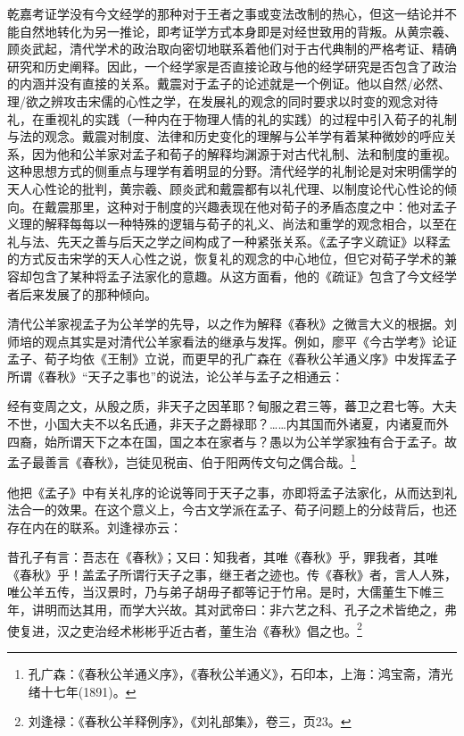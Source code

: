 \documentclass[a4paper, 12pt, openright]{ctexbook}
\renewenvironment{quote}
  {\list{}{\rightmargin2\ccwd \leftmargin2\ccwd \itemindent=2\ccwd \listparindent=2\ccwd}%
   \item\relax\small\kaishu\color{black}}
  {\endlist}
\begin{document}
乾嘉考证学没有今文经学的那种对于王者之事或变法改制的热心，但这一结论并不能自然地转化为另一推论，即考证学方式本身即是对经世致用的背叛。从黄宗羲、顾炎武起，清代学术的政治取向密切地联系着他们对于古代典制的严格考证、精确研究和历史阐释。因此，一个经学家是否直接论政与他的经学研究是否包含了政治的内涵并没有直接的关系。戴震对于孟子的论述就是一个例证。他以自然/必然、理/欲之辨攻击宋儒的心性之学，在发展礼的观念的同时要求以时变的观念对待礼，在重视礼的实践（一种内在于物理人情的礼的实践）的过程中引入荀子的礼制与法的观念。戴震对制度、法律和历史变化的理解与公羊学有着某种微妙的呼应关系，因为他和公羊家对孟子和荀子的解释均渊源于对古代礼制、法和制度的重视。这种思想方式的侧重点与理学有着明显的分野。清代经学的礼制论是对宋明儒学的天人心性论的批判，黄宗羲、顾炎武和戴震都有以礼代理、以制度论代心性论的倾向。在戴震那里，这种对于制度的兴趣表现在他对荀子的矛盾态度之中：他对孟子义理的解释每每以一种特殊的逻辑与荀子的礼义、尚法和重学的观念相合，以至在礼与法、先天之善与后天之学之间构成了一种紧张关系。《孟子字义疏证》以释孟的方式反击宋学的天人心性之说，恢复礼的观念的中心地位，但它对荀子学术的兼容却包含了某种将孟子法家化的意趣。从这方面看，他的《疏证》包含了今文经学者后来发展了的那种倾向。

清代公羊家视孟子为公羊学的先导，以之作为解释《春秋》之微言大义的根据。刘师培的观点其实是对清代公羊家看法的继承与发挥。例如，廖平《今古学考》论证孟子、荀子均依《王制》立说，而更早的孔广森在《春秋公羊通义序》中发挥孟子所谓《春秋》“天子之事也”的说法，论公羊与孟子之相通云：

\begin{quote}
经有变周之文，从殷之质，非天子之因革耶？甸服之君三等，蕃卫之君七等。大夫不世，小国大夫不以名氏通，非天子之爵禄耶？……内其国而外诸夏，内诸夏而外四裔，始所谓天下之本在国，国之本在家者与？愚以为公羊学家独有合于孟子。故孟子最善言《春秋》，岂徒见税亩、伯于阳两传文句之偶合哉。\footnote{孔广森：《春秋公羊通义序》，《春秋公羊通义》，石印本，上海：鸿宝斋，清光绪十七年(1891)。}
\end{quote}

他把《孟子》中有关礼序的论说等同于天子之事，亦即将孟子法家化，从而达到礼法合一的效果。在这个意义上，今古文学派在孟子、荀子问题上的分歧背后，也还存在内在的联系。刘逢禄亦云：

\begin{quote}
昔孔子有言：吾志在《春秋》；又曰：知我者，其唯《春秋》乎，罪我者，其唯《春秋》乎！盖孟子所谓行天子之事，继王者之迹也。传《春秋》者，言人人殊，唯公羊五传，当汉景时，乃与弟子胡毋子都等记于竹帛。是时，大儒董生下帷三年，讲明而达其用，而学大兴故。其对武帝曰：非六艺之科、孔子之术皆绝之，弗使复进，汉之吏治经术彬彬乎近古者，董生治《春秋》倡之也。\footnote{刘逢禄：《春秋公羊释例序》，《刘礼部集》，卷三，页23。}
\end{quote}
\end{document}
